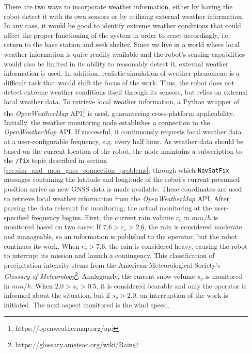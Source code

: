 \documentclass[english, master, utf8]{base/thesis_KBS}
\newcommand{\code}[1]{\colorbox{light-gray}{\texttt{#1}}}
\begin{document}
There are two ways to incorporate weather information, either by having the robot detect it with its own sensors or by utilizing external weather information. In any case,
it would be good to identify extreme weather conditions that could affect the proper functioning of the system in order to react accordingly, i.e. return to the base station and
seek shelter. Since we live in a world where local weather information is quite readily available and the robot's sensing capabilities would also be limited in its ability to
reasonably detect it, external weather information is used. In addition, realistic simulation of weather phenomena is a difficult task that would shift the focus of the work.
Thus, the robot does not detect extreme weather conditions itself through its sensors, but relies on external local weather data. To retrieve local weather information, a Python
wrapper of the \textit{OpenWeatherMap} API\footnote{https://openweathermap.org/api} is used, guaranteeing cross-platform applicability. Initially, the weather monitoring node
establishes a connection to the \textit{OpenWeatherMap} API. If successful, it continuously requests local weather data at a user-configurable frequency, e.g. every half hour.
As weather data should be based on the current location of the robot, the node maintains a subscription to the \code{/fix} topic described in section
\ref{sec:sim_and_mon_gnss_connection_problems}, through which \code{NavSatFix} messages containing the latitude and longitude of the robot's current presumed position arrive as
new GNSS data is made available. These coordinates are used to retrieve local weather information from the \textit{OpenWeatherMap} API. After parsing the data relevant for
monitoring, the actual monitoring at the user-specified frequency begins. First, the current rain volume $r_v$ in $mm/h$ is monitored based on two cases: If $7.6 > r_v > 2.6$,
the rain is considered moderate and manageable, so an information is published to the operator, but the robot continues its work. When $r_v > 7.6$, the rain is considered heavy,
causing the robot to interrupt its mission and launch a contingency. This classification of precipitation intensity stems from the American Meteorological Society's
\textit{Glossary of Meteorology}\footnote{https://glossary.ametsoc.org/wiki/Rain}. Analogously, the current snow volume $s_v$ is monitored in $mm/h$. When $2.0 > s_v > 0.5$, it is
considered bearable and only the operator is informed about the situation, but if $s_v > 2.0$, an interruption of the work is initiated. The next aspect monitored is the wind speed,
\end{document}
